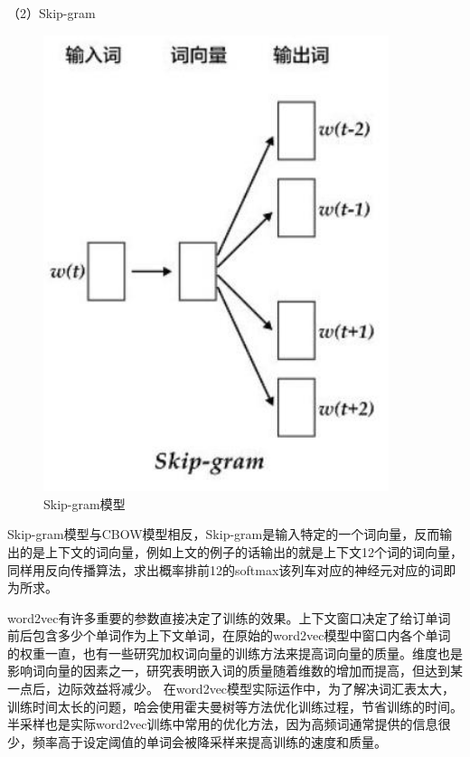 \documentclass[winfonts,master,oneside,nobackinfo]{njuthesis}
\begin{document}
（2）Skip-gram

\begin{figure}[h]
\centering
\begin{minipage}[t]{0.5\textwidth}
\includegraphics[width=0.9\textwidth]{./figure/Skip-gram模型.jpg}
\caption{Skip-gram模型}
\label{lab:1}
\end{minipage}
\end{figure}

Skip-gram模型与CBOW模型相反，Skip-gram是输入特定的一个词向量，反而输出的是上下文的词向量，例如上文的例子的话输出的就是上下文12个词的词向量，同样用反向传播算法，求出概率排前12的softmax该列车对应的神经元对应的词即为所求。

word2vec有许多重要的参数直接决定了训练的效果。上下文窗口决定了给订单词前后包含多少个单词作为上下文单词，在原始的word2vec模型中窗口内各个单词的权重一直，也有一些研究加权词向量的训练方法\cite{myh}来提高词向量的质量。维度也是影响词向量的因素之一，研究表明嵌入词的质量随着维数的增加而提高，但达到某一点后，边际效益将减少\cite{Mikolov}。
在word2vec模型实际运作中，为了解决词汇表太大，训练时间太长的问题，哈会使用霍夫曼树等方法优化训练过程，节省训练的时间。半采样也是实际word2vec训练中常用的优化方法，因为高频词通常提供的信息很少，频率高于设定阈值的单词会被降采样来提高训练的速度和质量。
\end{document}

